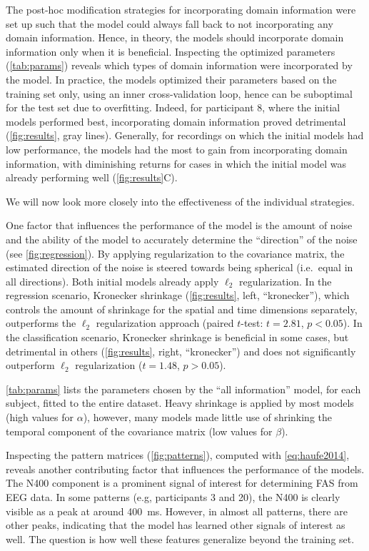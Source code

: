 \documentclass[a4paper]{vanvliet_paper}
\begin{document}
The post-hoc modification strategies for incorporating domain information were set up such that the model could always fall back to not incorporating any domain information.
Hence, in theory, the models should incorporate domain information only when it is beneficial.
Inspecting the optimized parameters (\autoref{tab:params}) reveals which types of domain information were incorporated by the model.
In practice, the models optimized their parameters based on the training set only, using an inner cross-validation loop, hence can be suboptimal for the test set due to overfitting.
Indeed, for participant 8, where the initial models performed best, incorporating domain information proved detrimental (\autoref{fig:results}, gray lines).
Generally, for recordings on which the initial models had low performance, the models had the most to gain from incorporating domain information, with diminishing returns for cases in which the initial model was already performing well (\autoref{fig:results}C).

We will now look more closely into the effectiveness of the individual strategies.

One factor that influences the performance of the model is the amount of noise and the ability of the model to accurately determine the ``direction'' of the noise (see \autoref{fig:regression}).
By applying regularization to the covariance matrix, the estimated direction of the noise is steered towards being spherical (i.e.\ equal in all directions).
Both initial models already apply $\ell_2$ regularization.
In the regression scenario, Kronecker shrinkage (\autoref{fig:results}, left, ``kronecker''), which controls the amount of shrinkage for the spatial and time dimensions separately, outperforms the $\ell_2$ regularization approach (paired $t$-test: $t=2.81$, $p < 0.05$).
In the classification scenario, Kronecker shrinkage is beneficial in some cases, but detrimental in others (\autoref{fig:results}, right, ``kronecker'') and does not significantly outperform $\ell_2$ regularization ($t=1.48$, $p > 0.05$).

\autoref{tab:params} lists the parameters chosen by the ``all information'' model, for each subject, fitted to the entire dataset.
Heavy shrinkage is applied by most models (high values for $\alpha$), however, many models made little use of shrinking the temporal component of the covariance matrix (low values for $\beta$).

Inspecting the pattern matrices (\autoref{fig:patterns}), computed with \autoref{eq:haufe2014}, reveals another contributing factor that influences the performance of the models.
The N400 component is a prominent signal of interest for determining \gls{FAS} from \gls{EEG} data\cite{Kutas2011}.
In some patterns (e.g, participants 3 and 20), the N400 is clearly visible as a peak at around \SI{400}{\milli\second}.
However, in almost all patterns, there are other peaks, indicating that the model has learned other signals of interest as well.
The question is how well these features generalize beyond the training set.
\end{document}
